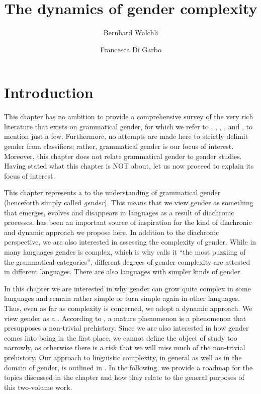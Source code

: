\documentclass[output=collectionpaper]{langsci/langscibook}
\title{The dynamics of gender complexity}
\author{%
Bernhard Wälchli%
\and%
Francesca Di Garbo%
\affiliation{Stockholm University}
}%
\begin{document}
\section{Introduction}
\label{sec:WDG:1}

This chapter has no ambition to provide a comprehensive survey of the very rich literature that exists on grammatical gender, for which we refer to \citet{Corbett1991,Corbett2006,Corbett2014}, \citet{Aikhenvald2000,Aikhenvald2016}, \citet{Kilarski2013}, \citet{Heine1982}, and \citet{Seifart2010}, to mention just a few. Furthermore, no attempts are made here to strictly delimit gender from classifiers; rather, grammatical gender is our focus of interest. Moreover, this chapter does not relate grammatical gender to gender studies. Having stated what this chapter is NOT about, let us now proceed to explain its focus of interest.

This chapter represents a  to the understanding of grammatical gender (henceforth simply called \textit{gender}). This means that we view gender as something that emerges, evolves and disappears in languages as a result of diachronic processes. \cite{Greenberg1978} has been an important source of inspiration for the kind of diachronic and dynamic approach we propose here. In addition to the diachronic perspective, we are also interested in assessing the complexity of gender. While in many languages gender is complex, which is why \cite[1]{Corbett1991} calls it ``the most puzzling of the grammatical categories'', different degrees of gender complexity are attested in different languages. There are also languages with simpler kinds of gender.

In this chapter we are interested in why gender can grow quite complex in some languages and remain rather simple or turn simple again in other languages. Thus, even as far as complexity is concerned, we adopt a dynamic approach. We view gender as a . According to \cite[2]{Dahl2004}, a mature phenomenon is a phenomenon that presupposes a non-trivial prehistory. Since we are also interested in how gender comes into being in the first place, we cannot define the object of study too narrowly, as otherwise there is a risk that we will miss much of the non-trivial prehistory. Our approach to linguistic complexity, in general as well as in the domain of gender, is outlined in . In the following, we provide a roadmap for the topics discussed in the chapter and how they relate to the general purposes of this two-volume work.
\end{document}

